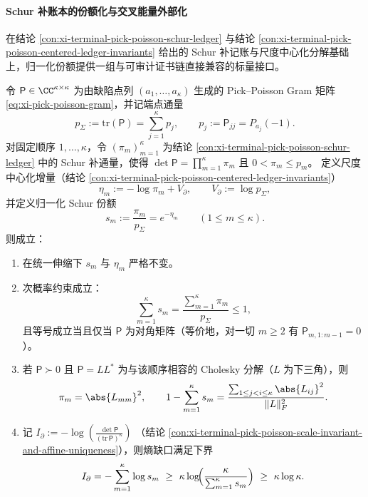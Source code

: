 \paragraph{Schur 补账本的份额化与交叉能量外部化}
在结论 \ref{con:xi-terminal-pick-poisson-schur-ledger} 与结论 \ref{con:xi-terminal-pick-poisson-centered-ledger-invariants} 给出的 Schur 补记账与尺度中心化分解基础上，归一化份额提供一组与可审计证书链直接兼容的标量接口。

\setcounter{auditthm}{582}

\begin{auditthm}\label{thm:xi-schur-ledger-subprobability-offdiagonal-gap}
令 \(\mathsf P\in\CC^{\kappa\times\kappa}\) 为由缺陷点列 \((a_1,\dots,a_\kappa)\) 生成的 Pick--Poisson Gram 矩阵 \eqref{eq:xi-pick-poisson-gram}，并记端点通量
\[
p_\Sigma:=\mathrm{tr}(\mathsf P)=\sum_{j=1}^{\kappa}p_j,
\qquad
p_j:=\mathsf P_{jj}=P_{a_j}(-1).
\]
对固定顺序 \(1,\dots,\kappa\)，令 \((\pi_m)_{m=1}^{\kappa}\) 为结论 \ref{con:xi-terminal-pick-poisson-schur-ledger} 中的 Schur 补通量，使得
\(
\det\mathsf P=\prod_{m=1}^{\kappa}\pi_m
\)
且 \(0<\pi_m\le p_m\)。
定义尺度中心化增量（结论 \ref{con:xi-terminal-pick-poisson-centered-ledger-invariants}）
\[
\eta_m:=-\log\pi_m+V_\partial,
\qquad
V_\partial:=\log p_\Sigma,
\]
并定义归一化 Schur 份额
\[
s_m:=\frac{\pi_m}{p_\Sigma}=e^{-\eta_m}\qquad(1\le m\le\kappa).
\]
则成立：
\begin{enumerate}
  \item 在统一伸缩下 \(s_m\) 与 \(\eta_m\) 严格不变。
  \item 次概率约束成立：
  \[
  \sum_{m=1}^{\kappa}s_m=\frac{\sum_{m=1}^{\kappa}\pi_m}{p_\Sigma}\le 1,
  \]
  且等号成立当且仅当 \(\mathsf P\) 为对角矩阵（等价地，对一切 \(m\ge 2\) 有 \(\mathsf P_{m,1:m-1}=0\)）。
  \item 若 \(\mathsf P\succ 0\) 且 \(\mathsf P=LL^\ast\) 为与该顺序相容的 Cholesky 分解（\(L\) 为下三角），则
  \[
  \pi_m=\abs{L_{mm}}^2,
  \qquad
  1-\sum_{m=1}^{\kappa}s_m=\frac{\sum_{1\le j<i\le\kappa}\abs{L_{ij}}^2}{\|L\|_F^2}.
  \]
  \item 记
  \(
  I_\partial:=-\log\!\left(\frac{\det\mathsf P}{(\mathrm{tr}\,\mathsf P)^{\kappa}}\right)
  \)
  （结论 \ref{con:xi-terminal-pick-poisson-scale-invariant-and-affine-uniqueness}），则熵缺口满足下界
  \[
  I_\partial
  =-\sum_{m=1}^{\kappa}\log s_m
  \ \ge\
  \kappa\log\!\Bigl(\frac{\kappa}{\sum_{m=1}^{\kappa}s_m}\Bigr)
  \ \ge\
  \kappa\log\kappa.
  \]
\end{enumerate}
\end{auditthm}
